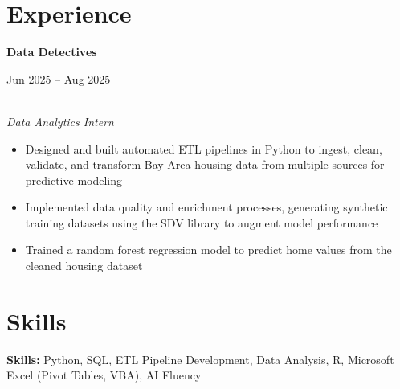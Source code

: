 \documentclass[11pt,letterpaper]{article}
\newcommand{\entry}[3]{%
  \noindent\begin{minipage}[t]{0.72\textwidth}\raggedright\textbf{#1}\end{minipage}%
  \hfill\begin{minipage}[t]{0.26\textwidth}\raggedleft\small\color{gray}#2\end{minipage}\\
  \textit{#3}\par\vspace{2pt}
}
\begin{document}


\vspace{6pt}



\section*{Experience}



\entry{Data Detectives}{Jun 2025 -- Aug 2025}{Data Analytics Intern}
\begin{itemize}
  \item Designed and built automated ETL pipelines in Python to ingest, clean, validate, and transform Bay Area housing data from multiple sources for predictive modeling
  \item Implemented data quality and enrichment processes, generating synthetic training datasets using the SDV library to augment model performance
  \item Trained a random forest regression model to predict home values from the cleaned housing dataset
\end{itemize}





\section*{Skills}
\textbf{Skills:} Python, SQL, ETL Pipeline Development, Data Analysis, R, Microsoft Excel (Pivot Tables, VBA), AI Fluency
\end{document}
